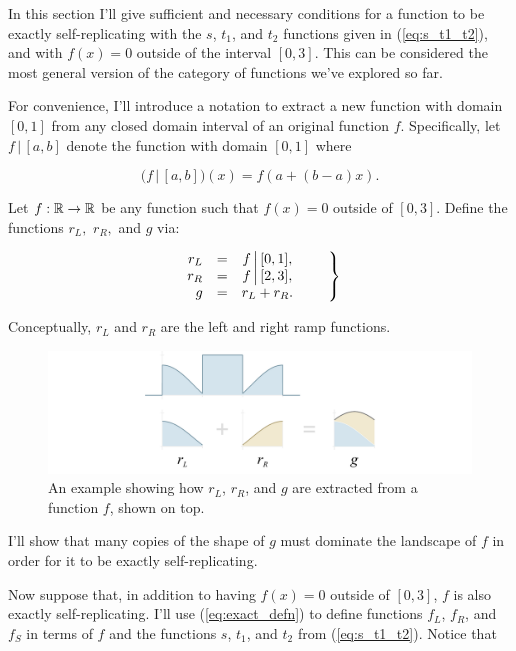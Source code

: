 \documentclass[]{article}
\begin{document}
In this section I'll give sufficient and necessary conditions for a
function to be exactly self-replicating with the \(s\), \(t_1\), and
\(t_2\) functions given in (\ref{eq:s_t1_t2}), and with \(f(x)=0\)
outside of the interval \([0, 3]\). This can be considered the most
general version of the category of functions we've explored so far.

\newcommand{\restrict}{\,\big|\,}

For convenience, I'll introduce a notation to extract a new function
with domain \([0, 1]\) from any closed domain interval of an original
function \(f\). Specifically, let \(f \restrict [a, b]\) denote the
function with domain \([0,1]\) where

\[
\big(f \restrict [a,b]\big)(x) = f(a + (b-a)x).
\]

Let \(f:\mathbb{R}\to\mathbb{R}\) be any function such that \(f(x)=0\) outside of
\([0, 3]\). Define the functions \(r_L,\) \(r_R,\) and \(g\) via:

\begin{equation}\eqnset{\begin{array}{rlc}
r_L & = & f\restrict [0, 1], \\
r_R & = & f\restrict [2, 3], \\
g   & = & r_L + r_R.
\end{array}}\label{eq:rL_rR_g}\end{equation}

Conceptually, \(r_L\) and \(r_R\) are the left and right ramp functions.

\begin{figure}[htbp]
\centering
\includegraphics{images/pdfs/nonpl_setup.pdf}
\caption{\label{fig:nonpl_setup}An example showing how \(r_L\), \(r_R\),
and \(g\) are extracted from a function \(f\), shown on
top.}\label{fig:nonplux5fsetup}
\end{figure}

I'll show that many copies of the shape of \(g\) must dominate the
landscape of \(f\) in order for it to be exactly self-replicating.

Now suppose that, in addition to having \(f(x)=0\) outside of \([0,3]\),
\(f\) is also exactly self-replicating. I'll use (\ref{eq:exact_defn})
to define functions \(f_L\), \(f_R\), and \(f_S\) in terms of \(f\) and
the functions \(s\), \(t_1\), and \(t_2\) from (\ref{eq:s_t1_t2}).
Notice that
\end{document}

